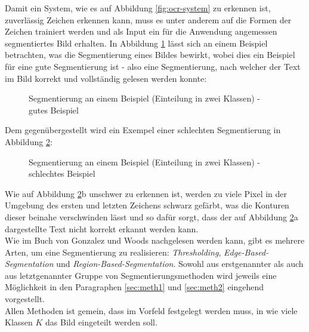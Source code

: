 		Damit ein System, wie es auf Abbildung \ref{fig:ocr-system} zu 
		erkennen ist, zuverlässig Zeichen erkennen kann, muss es unter 
		anderem auf die Formen der Zeichen trainiert werden und als Input ein für 
		die Anwendung angemessen segmentiertes Bild erhalten. In Abbildung \ref{fig:seg-example-good} lässt sich an einem Beispiel betrachten, was die Segmentierung eines Bildes bewirkt, wobei dies ein Beispiel für eine gute Segmentierung ist - also eine Segmentierung, nach welcher der Text im Bild korrekt und vollständig gelesen werden konnte:
		\begin{figure}[H]
			\centering
			\qquad
			\caption{Segmentierung an einem Beispiel (Einteilung in zwei Klassen) - gutes Beispiel}
			\label{fig:seg-example-good}
		\end{figure}
		Dem gegenübergestellt wird ein Exempel einer schlechten Segmentierung in Abbildung \ref{fig:seg-example-bad}:
		\begin{figure}[H]
			\centering
			\qquad
			\caption{Segmentierung an einem Beispiel (Einteilung in zwei Klassen) - schlechtes Beispiel}
			\label{fig:seg-example-bad}
		\end{figure}
		Wie auf Abbildung \ref{fig:seg-example-bad}b unschwer zu erkennen ist, werden zu viele Pixel in der Umgebung des ersten und letzten Zeichens schwarz gefärbt, was die Konturen dieser beinahe verschwinden lässt und so dafür sorgt, dass der auf Abbildung \ref{fig:seg-example-bad}a dargestellte Text nicht korrekt erkannt werden kann.\\
		Wie im Buch \cite[Kapitel 10]{gonzalez-woods} von Gonzalez und Woods nachgelesen werden kann, gibt es mehrere Arten, um eine Segmentierung zu realisieren: \textit{Thresholding}, \textit{Edge-Based-Segmentation} und \textit{Region-Based-Segmentation}. Sowohl aus erstgenannter als auch aus letztgenannter Gruppe von Segmentierungsmethoden wird jeweils eine Möglichkeit in den Paragraphen \ref{sec:meth1} und \ref{sec:meth2} eingehend vorgestellt. \\
		Allen Methoden ist gemein, dass im Vorfeld festgelegt werden muss, in wie viele Klassen $K$ das Bild eingeteilt werden soll. 
		
